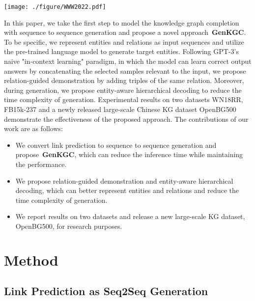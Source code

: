 \documentclass[sigconf]{acmart}
\newcommand{\ours}{\textbf{GenKGC}}
\begin{document}
\begin{figure*}[!t] \centering \texttt{[image: ./figure/WWW2022.pdf]} \caption{
Architecture of \ours. We augment the input text of entity and relation with  demonstrations, and introduce entity-aware hierarchical decoding for fast inference.}
\label{fig:model}
\end{figure*}

 
In this paper, we take the first step to model the knowledge graph completion with sequence to sequence generation and propose a novel approach~\ours.
To be specific, we represent entities and relations as input sequences and utilize the pre-trained language model to generate target entities.
Following GPT-3's naive "in-context learning" paradigm, in which the model can learn correct output answers by concatenating the selected samples relevant to the input, we propose relation-guided demonstration by adding triples of the same relation.
Moreover, during generation, we propose entity-aware hierarchical decoding to reduce the time complexity of generation.
Experimental results on two datasets WN18RR, FB15k-237 and a newly released large-scale Chinese KG dataset OpenBG500 demonstrate the effectiveness of the proposed approach.
The contributions of our work are as follows:

\begin{itemize}
    \item We convert link prediction to sequence to sequence generation and propose~\ours, which can reduce the inference time while maintaining the performance.
    \item We propose relation-guided demonstration and entity-aware hierarchical decoding, which can better represent entities and relations and reduce the time complexity of generation.
    \item We report results on two datasets and release a new large-scale KG dataset, OpenBG500, for research purposes.
\end{itemize}



\section{Method}


\subsection{Link Prediction as Seq2Seq Generation}
\end{document}
